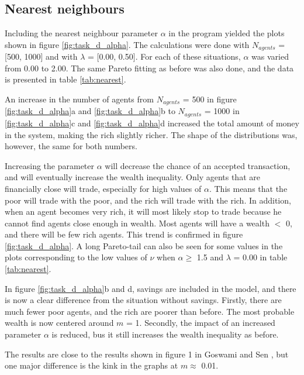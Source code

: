 \documentclass[11pt,a4paper,titlepage]{article}
\begin{document}
\subsection{Nearest neighbours}
Including the nearest neighbour parameter $\alpha$ in the program yielded the plots shown in figure \ref{fig:task_d_alpha}. The calculations were done with $N_{agents}$ = [500, 1000] and with $\lambda$ = [0.00, 0.50]. For each of these situations, $\alpha$ was varied from 0.00 to 2.00. The same Pareto fitting as before was also done, and the data is presented in table \ref{tab:nearest}.

An increase in the number of agents from $N_{agents}$ = 500 in figure \ref{fig:task_d_alpha}a and \ref{fig:task_d_alpha}b to $N_{agents}$ = 1000 in \ref{fig:task_d_alpha}c and \ref{fig:task_d_alpha}d increased the total amount of money in the system, making the rich slightly richer. The shape of the distributions was, however, the same for both numbers. 

Increasing the parameter $\alpha$ will decrease the chance of an accepted transaction, and will eventually increase the wealth inequality. Only agents that are financially close will trade, especially for high values of $\alpha$. This means that the poor will trade with the poor, and the rich will trade with the rich. In addition, when an agent becomes very rich, it will most likely stop to trade because he cannot find agents close enough in wealth. 
Most agents will have a wealth $<$ 0, and there will be few rich agents.
This trend is confirmed in figure \ref{fig:task_d_alpha}. A long Pareto-tail can also be seen for some values in the plots corresponding to the low values of $\nu$ when $\alpha \geq$ 1.5 and $\lambda$ = 0.00 in table \ref{tab:nearest}.

In figure \ref{fig:task_d_alpha}b and d, savings are included in the model, and there is now a clear difference from the situation without savings. Firstly, there are much fewer poor agents, and the rich are poorer than before. The most probable wealth is now centered around $m$ = 1. Secondly, the impact of an increased parameter $\alpha$ is reduced, bus it still increases the wealth inequality as before. 

The results are close to the results shown in figure 1 in Goswami and Sen \cite{Goswami}, but one major difference is the kink in the graphs at $m \approx$ 0.01. 
\end{document}
